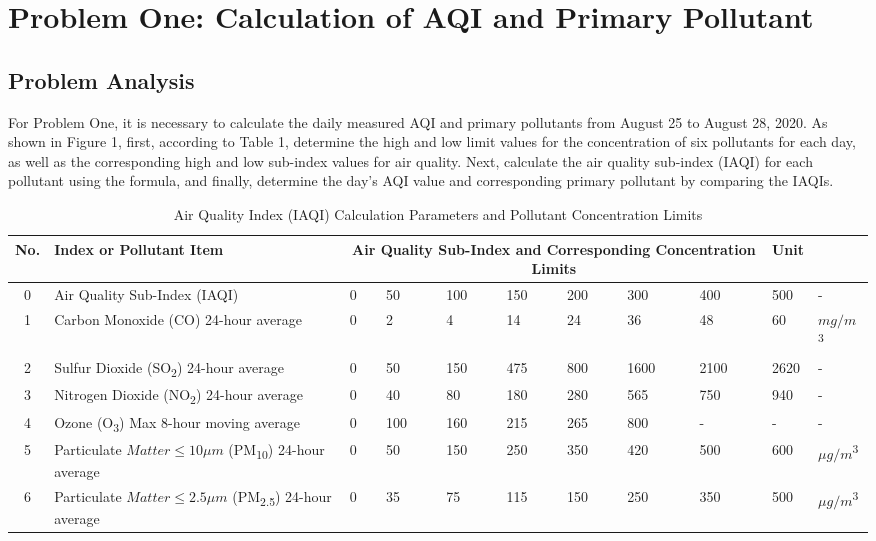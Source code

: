 \documentclass[12pt]{article}
\begin{document}
\section{Problem One: Calculation of AQI and Primary Pollutant}
\subsection{Problem Analysis}
For Problem One, it is necessary to calculate the daily measured AQI and primary pollutants from August 25 to August 28, 2020. As shown in Figure 1, first, according to Table 1, determine the high and low limit values for the concentration of six pollutants for each day, as well as the corresponding high and low sub-index values for air quality. Next, calculate the air quality sub-index (IAQI) for each pollutant using the formula, and finally, determine the day's AQI value and corresponding primary pollutant by comparing the IAQIs.


\begin{table}[h!]
	\centering
	\begin{adjustbox}{width=1\textwidth}
	\begin{tabular}{cllllllllll}
		\hline
		No. & Index or Pollutant Item & \multicolumn{7}{c}{Air Quality Sub-Index and Corresponding Concentration Limits} & Unit \\
		\hline
		0 & Air Quality Sub-Index (IAQI) & 0 & 50 & 100 & 150 & 200 & 300 & 400 & 500 & - \\
		1 & Carbon Monoxide (CO) 24-hour average & 0 & 2 & 4 & 14 & 24 & 36 & 48 & 60 & $mg/m$\textsuperscript{3} \\
		2 & Sulfur Dioxide (SO\textsubscript{2}) 24-hour average & 0 & 50 & 150 & 475 & 800 & 1600 & 2100 & 2620 & - \\
		3 & Nitrogen Dioxide (NO\textsubscript{2}) 24-hour average & 0 & 40 & 80 & 180 & 280 & 565 & 750 & 940 & - \\
		4 & Ozone (O\textsubscript{3}) Max 8-hour moving average & 0 & 100 & 160 & 215 & 265 & 800 & - & - & - \\
		5 & Particulate $Matter \leq 10\mu m$ (PM\textsubscript{10}) 24-hour average & 0 & 50 & 150 & 250 & 350 & 420 & 500 & 600 & $\mu g/m$\textsuperscript{3} \\
		6 & Particulate $Matter \leq 2.5\mu m$ (PM\textsubscript{2.5}) 24-hour average & 0 & 35 & 75 & 115 & 150 & 250 & 350 & 500 & $\mu g/m$\textsuperscript{3} \\
		\hline
	\end{tabular}
	\end{adjustbox}
	\caption{Air Quality Index (IAQI) Calculation Parameters and Pollutant Concentration Limits}
	\label{tab2}
\end{table}
\end{document}
